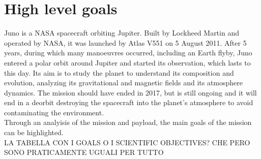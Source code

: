 \section{High level goals}
\label{sec:goals}
Juno is a NASA spacecraft orbiting Jupiter. Built by Lockheed Martin and operated by NASA, it was launched by Atlas V551 on 5 August 2011. After 5 years, during which many manoeuvres occurred, including an Earth flyby, Juno entered a polar orbit around Jupiter and started its observation, which lasts to this day. Its aim is to study the planet to understand its composition and evolution, analyzing its gravitational and magnetic fields and its atmosphere dynamics. The mission should have ended in 2017, but is still ongoing and it will end in a deorbit destroying the spacecraft into the planet's atmosphere to avoid contaminating the environment. 
\\   

Through an analyisis of the mission and payload, the main goals of the mission can be highlighted. \\


LA TABELLA CON I GOALS O I SCIENTIFIC OBJECTIVES? CHE PERO SONO PRATICAMENTE UGUALI PER TUTTO \\


